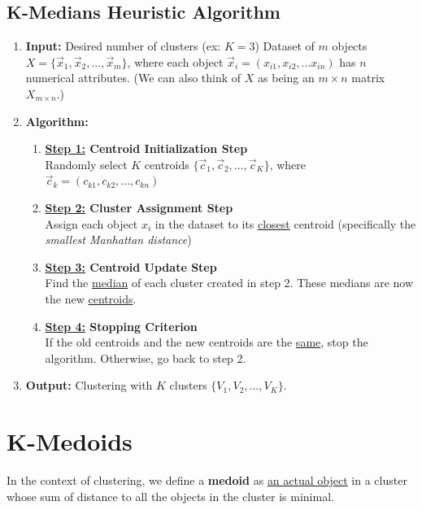 \documentclass[11pt]{elegantbook}
\begin{document}
\subsection{K-Medians Heuristic Algorithm}
\begin{enumerate}
    \item \textbf{Input:}
    \subitem Desired number of clusters (ex: $K=3$)
    \subitem Dataset of $m$ objects $X=\{\vec{x}_1,\vec{x}_2,...,\vec{x}_m\}$, where each object $\vec{x}_i=(x_{i1},x_{i2},...x_{in})$ has $n$ numerical attributes. (We can also think of $X$ as being an $m\times n$ matrix $X_{m\times n}$.)
    \item \textbf{Algorithm:}
    \begin{enumerate}[$\bullet$]
        \item \textbf{\underline{Step 1:} Centroid Initialization Step}\\
        Randomly select $K$ centroids $\{\vec{c}_1,\vec{c}_2,...,\vec{c}_K\}$, where $\vec{c}_k=(c_{k1},c_{k2},...,c_{kn})$
        \item \textbf{\underline{Step 2:} Cluster Assignment Step}\\
        Assign each object $x_i$ in the dataset to its \underline{closest} centroid (specifically the \textit{smallest Manhattan distance})
        \item \textbf{\underline{Step 3:} Centroid Update Step}\\
        Find the \underline{median} of each cluster created in step 2. These medians are now the new \underline{centroids}.
        \item \textbf{\underline{Step 4:} Stopping Criterion}\\
        If the old centroids and the new centroids are the \underline{same}, stop the algorithm. Otherwise, go back to step 2.
    \end{enumerate}
    \item \textbf{Output:} Clustering with $K$ clusters $\{V_1,V_2,...,V_K\}$.
\end{enumerate}


\section{K-Medoids}
\begin{definition}[Medoid]
    In the context of clustering, we define a \textbf{medoid} as \underline{an actual object} in a cluster whose sum of distance to all the objects in the cluster is minimal.
\end{definition}
\end{document}
